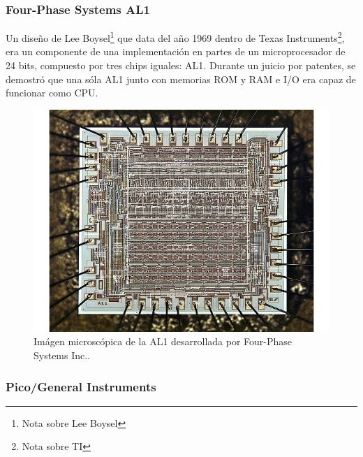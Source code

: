 \subsubsection{Four-Phase Systems AL1}

Un diseño de Lee Boysel\footnote{Nota sobre Lee Boysel} que data del año 1969 dentro de Texas Instruments\footnote{Nota sobre TI}, era un componente de una implementación en partes de un microprocesador de 24 bits, compuesto por tres chips iguales: AL1. Durante un juicio por patentes, se demostró que una sóla AL1 junto con memorias ROM y RAM e I/O era capaz de funcionar como CPU.

\begin{figure}
  \centering
  \includegraphics[scale=0.5]{./figures/C02-al1}
  \captionsetup{justification=centering}
  \caption{Imágen microscópica de la AL1 desarrollada por Four-Phase Systems Inc..}
  \label{fig:C02-al1}
\end{figure}


\subsubsection{Pico/General Instruments}

